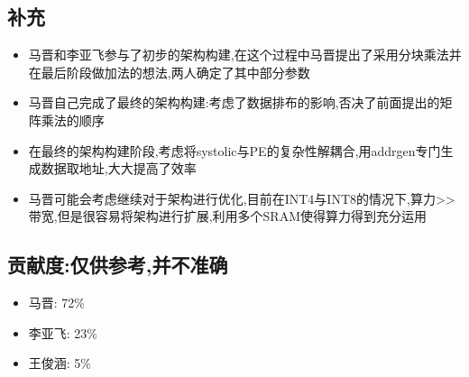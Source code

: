 \documentclass[zihao=-4, UTF8]{ctexart}
\begin{document}
\subsection{补充}
\begin{itemize}
    \item 马晋和李亚飞参与了初步的架构构建,在这个过程中马晋提出了采用分块乘法并在最后阶段做加法的想法,两人确定了其中部分参数
    \item 马晋自己完成了最终的架构构建:考虑了数据排布的影响,否决了前面提出的矩阵乘法的顺序
    \item 在最终的架构构建阶段,考虑将systolic与PE的复杂性解耦合,用addrgen专门生成数据取地址,大大提高了效率
    \item 马晋可能会考虑继续对于架构进行优化,目前在INT4与INT8的情况下,算力>>带宽,但是很容易将架构进行扩展,利用多个SRAM使得算力得到充分运用
\end{itemize}
\subsection{贡献度:仅供参考,并不准确}
\begin{itemize}
    \item 马晋: 72\%
    \item 李亚飞: 23\%
    \item 王俊涵: 5\%
\end{itemize}
\end{document}
